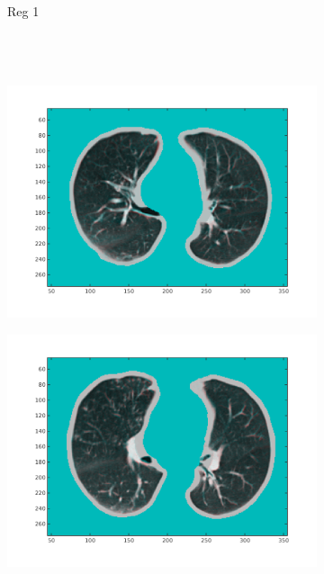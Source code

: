 \documentclass[11pt,a4paper,oneside]{report}
\begin{document}
\begin{figure}[H]
  \centering
  \begin{subfigure}[b]{0.1\textwidth}
    Reg 1\\\\\\\\
  \end{subfigure}%
  \hspace*{-1.9em}
  \begin{subfigure}[b]{0.3\textwidth}
	  \includegraphics[width=\textwidth, trim=20 20 20 20]{figures/reg1/reg1_1_66.png}
  \end{subfigure}%
  \begin{subfigure}[b]{0.3\textwidth}
	  \includegraphics[width=\textwidth, trim=20 20 20 20]{figures/reg1/reg2_5_60.png}

\end{subfigure}
\end{figure}
\end{document}
